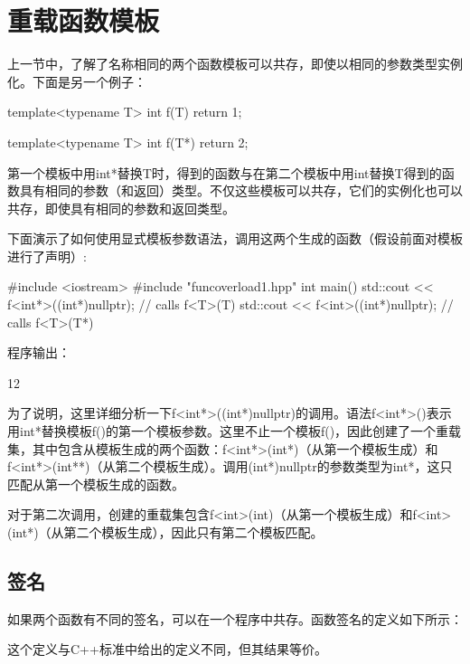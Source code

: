 \section{重载函数模板}


上一节中，了解了名称相同的两个函数模板可以共存，即使以相同的参数类型实例化。下面是另一个例子：

\begin{cpp}
template<typename T>
int f(T)
{
	return 1;
}

template<typename T>
int f(T*)
{
	return 2;
}
\end{cpp}

第一个模板中用int*替换T时，得到的函数与在第二个模板中用int替换T得到的函数具有相同的参数（和返回）类型。不仅这些模板可以共存，它们的实例化也可以共存，即使具有相同的参数和返回类型。

下面演示了如何使用显式模板参数语法，调用这两个生成的函数（假设前面对模板进行了声明）:

\begin{cpp}
#include <iostream>
#include "funcoverload1.hpp"
int main()
{
	std::cout << f<int*>((int*)nullptr); // calls f<T>(T)
	std::cout << f<int>((int*)nullptr); // calls f<T>(T*)
}
\end{cpp}

程序输出：

\begin{shell}
12
\end{shell}

为了说明，这里详细分析一下f<int*>((int*)nullptr)的调用。语法f<int*>()表示用int*替换模板f()的第一个模板参数。这里不止一个模板f()，因此创建了一个重载集，其中包含从模板生成的两个函数：f<int*>(int*)（从第一个模板生成）和f<int*>(int**)（从第二个模板生成）。调用(int*)nullptr的参数类型为int*，这只匹配从第一个模板生成的函数。

对于第二次调用，创建的重载集包含f<int>(int)（从第一个模板生成）和f<int>(int*)（从第二个模板生成），因此只有第二个模板匹配。

\subsection{签名}

如果两个函数有不同的签名，可以在一个程序中共存。函数签名的定义如下所示：

\begin{notice}
这个定义与C++标准中给出的定义不同，但其结果等价。
\end{notice}

